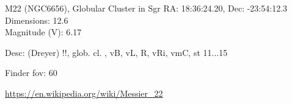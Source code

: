 \begin{block}{M22 (NGC6656), Globular Cluster in Sgr}
    RA: 18:36:24.20, Dec: -23:54:12.3 \\ 
    Dimensions: 12.6 \\ 
    Magnitude (V): 6.17


    Desc: (Dreyer) !!, glob. cl. , vB, vL, R, vRi, vmC, st 11...15 

    Finder fov: 60 

    \url{https://en.wikipedia.org/wiki/Messier_22} 
\end{block}
